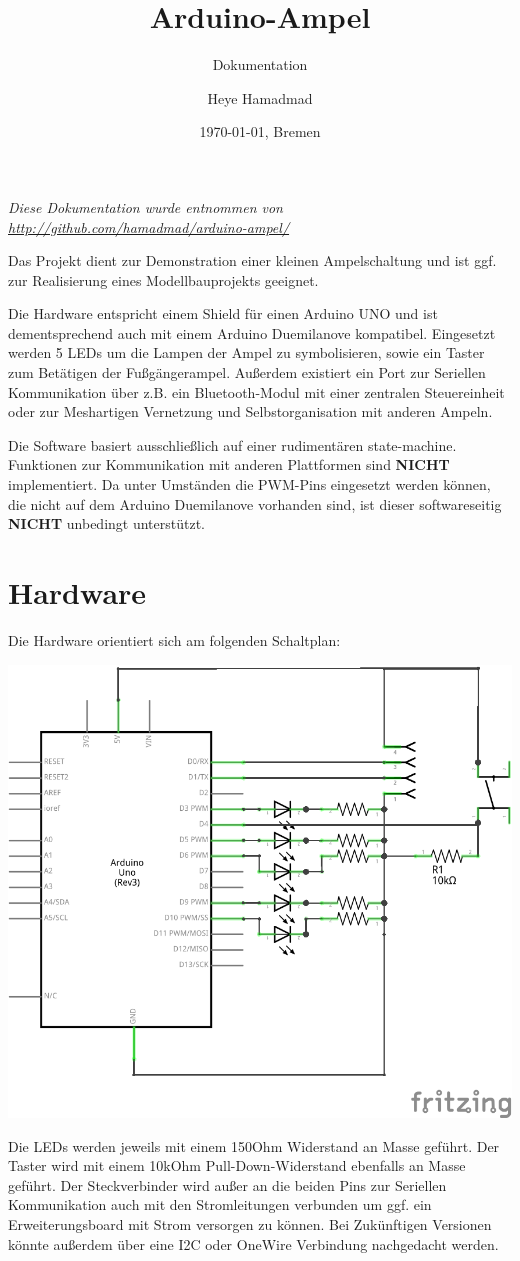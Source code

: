 \documentclass[halfparskip]{scrartcl}
\title{Arduino-Ampel}
\subtitle{Dokumentation}
\author{Heye Hamadmad}
\date{\today{}, Bremen}
\begin{document}
\maketitle

\textit{Diese Dokumentation wurde entnommen von \url{http://github.com/hamadmad/arduino-ampel/}}

Das Projekt dient zur Demonstration einer kleinen Ampelschaltung und ist ggf. zur Realisierung eines Modellbauprojekts geeignet.

Die Hardware entspricht einem Shield für einen Arduino UNO und ist dementsprechend auch mit einem Arduino Duemilanove kompatibel.
Eingesetzt werden 5 LEDs um die Lampen der Ampel zu symbolisieren, sowie ein Taster zum Betätigen der Fußgängerampel.
Außerdem existiert ein Port zur Seriellen Kommunikation über z.B. ein Bluetooth-Modul mit einer zentralen Steuereinheit oder zur Meshartigen Vernetzung und Selbstorganisation mit anderen Ampeln.

Die Software basiert ausschließlich auf einer rudimentären state-machine. Funktionen zur Kommunikation mit anderen Plattformen sind \textbf{NICHT} implementiert. Da unter Umständen die PWM-Pins eingesetzt werden können, die nicht auf dem Arduino Duemilanove vorhanden sind, ist dieser softwareseitig \textbf{NICHT} unbedingt unterstützt.

\section{Hardware}
\label{sec:hardware}
Die Hardware orientiert sich am folgenden Schaltplan:
\begin{center}
    \includegraphics[width=1\textwidth]{hardware/schaltplan}
\end{center}
Die LEDs werden jeweils mit einem 150Ohm Widerstand an Masse geführt.
Der Taster wird mit einem 10kOhm Pull-Down-Widerstand ebenfalls an Masse geführt.
Der Steckverbinder wird außer an die beiden Pins zur Seriellen Kommunikation auch mit den Stromleitungen verbunden um ggf. ein Erweiterungsboard mit Strom versorgen zu können. Bei Zukünftigen Versionen könnte außerdem über eine I2C oder OneWire Verbindung nachgedacht werden.
\end{document}
